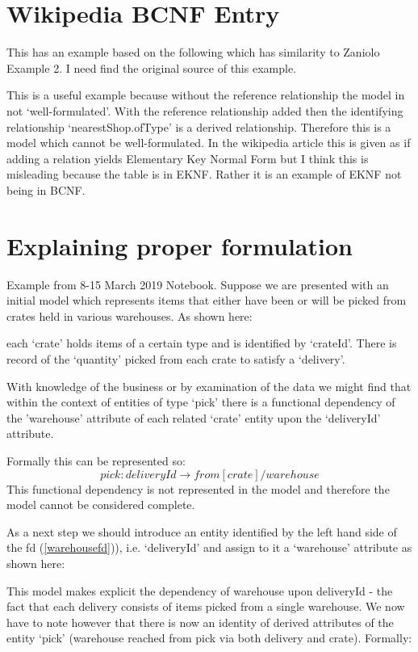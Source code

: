 \documentclass[10pt,a4paper]{scrartcl}
\renewcommand{\erpictureFolder}[0]{../SharedPictures}
\begin{document}
\section{Wikipedia BCNF Entry}
This has an example based on the following which has similarity to Zaniolo Example 2.
I need find the original source of this example.
\begin{center}

\end{center}
This is a useful example because without the reference relationship the model in not `well-formulated'. With the reference relationship added
then the identifying relationship `nearestShop.ofType' is a derived relationship. Therefore this is a model which cannot be well-formulated.
In the wikipedia article this is given as if adding a relation yields Elementary Key Normal Form but I think this is misleading because 
the table is in EKNF. Rather it is an example of EKNF not being in BCNF.

\section{Explaining proper formulation}
Example from 8-15 March 2019 Notebook.
Suppose we are presented with an  initial model which represents items that either have been or will be picked from crates held in various warehouses.
As shown here:
\begin{center}

\end{center}
each `crate' holds items of a certain type and is identified by `crateId'. There is record of 
the `quantity' picked from each crate to satisfy a `delivery'.  

With knowledge of the business or by examination of the data we might find that  within the context 
of entities of type `pick' there is a functional dependency of the 'warehouse' attribute of each  related `crate' entity upon the `deliveryId' attribute.

Formally this can be represented so:
\begin{equation}
\label{warehousefd}
pick: deliveryId \longrightarrow  from[crate]/warehouse
\end{equation}
This functional dependency is not represented in the model and therefore the model cannot be 
considered complete.

As a next step we should introduce an entity identified by the left hand side 
of the fd (\ref{warehousefd})), i.e.
 `deliveryId' and assign to it a `warehouse' attribute as shown here:
\begin{center}

\end{center}
This model makes explicit the dependency of warehouse upon deliveryId - the fact that each delivery consists of items picked from a single warehouse. We now have to note however that there is now
an identity of derived attributes of the entity `pick' (warehouse reached from pick via both delivery and crate). Formally:
\end{document}
